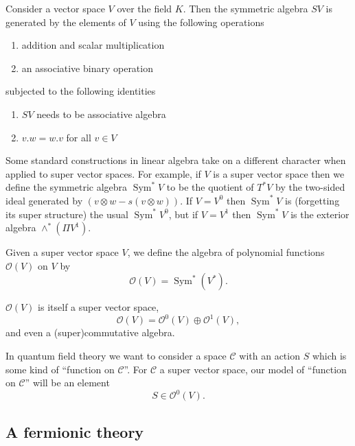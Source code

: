 \documentclass[12pt,letterpaper,reqno]{article}
\numberwithin{equation}{section}
\newcommand{\cC}{\ensuremath{\mathcal C}}
\newcommand{\cO}{\ensuremath{\mathcal O}}
\DeclareMathOperator{\Sym}{Sym}
\begin{document}
\begin{defn}
  Consider a vector space $V$ over the field $K$.  Then the symmetric algebra $SV$ is generated by the elements of $V$ using the following operations
  \begin{enumerate}
  \item addition and scalar multiplication
  \item an associative binary operation
  \end{enumerate}
subjected to the following identities
\begin{enumerate}
\item $SV$ needs to be associative algebra
\item $v.w=w.v$ for all $v\in V$
\end{enumerate}
\end{defn}

Some standard constructions in linear algebra take on a different
character when applied to super vector spaces. For example,
if $V$ is a super vector space then we define the symmetric 
algebra $\Sym^* V$ to be the quotient of $T^* V$ by
the two-sided ideal generated by $(v \otimes w - s(v \otimes w))$.
If $V = V^0$ then $\Sym^*V$ is (forgetting its super structure) 
the usual $\Sym^* V^0$,
but if $V = V^1$ then $\Sym^* V$ is the exterior algebra $\wedge^* (\Pi V^1)$.

\begin{defn}
Given a super vector space $V$, 
we define the algebra of polynomial functions $\cO(V)$ on $V$
by
\begin{equation}
  \cO(V) = \Sym^* (V^*).
\end{equation}
\end{defn}

$\cO(V)$ is itself a super vector space,
\begin{equation}
  \cO(V) = \cO^0(V) \oplus \cO^1(V),
\end{equation}
and even a (super)commutative algebra.

In quantum field theory we want to consider a space $\cC$ 
with an action $S$ which is some kind of ``function on $\cC$''. 
For $\cC$ a super vector space, our model of ``function on $\cC$''
will be an element
\begin{equation}
S \in \cO^0(V).
\end{equation}


\subsection{A fermionic theory}
\end{document}

